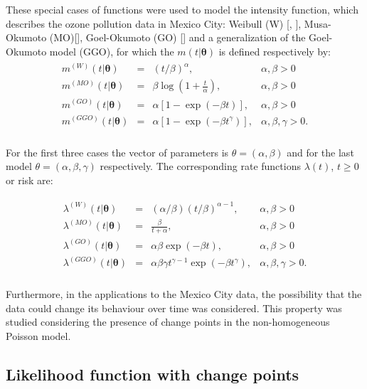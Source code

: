\documentclass[APA,STIX1COL]{WileyNJD-v2}
\begin{document}
These special cases of functions were used to model the  intensity function, which describes the ozone pollution data in Mexico City: Weibull (W) [\cite{Govind95}, \cite{Cid99}], Musa-Okumoto (MO)[\cite{Musa84}], Goel-Okumoto (GO) [\cite{Goel78}] and a generalization of the Goel-Okumoto model (GGO), for which the $m(t|\mathbf{\theta})$ is defined respectively by:
\begin{eqnarray}
	\label{eq1}
	\begin{array}{llll}
		m^{(W)}(t|\mathbf{\theta}) &=& (t/\beta)^{\alpha}, &\alpha ,\beta >0\\
		m^{(MO)}(t|\mathbf{\theta}) &=& \beta\log \left(1+\frac{t}{\alpha}\right), &\alpha ,\beta >0\\
		m^{(GO)}(t|\mathbf{\theta}) &=& \alpha [1-\exp (-\beta t)], &\alpha ,\beta >0\\
		m^{(GGO)}(t|\mathbf{\theta}) &=& \alpha [1-\exp (-\beta t^\gamma)], &\alpha ,\beta , \gamma >0.\\
	\end{array}
\end{eqnarray}

For the first three cases the vector of parameters is $\theta=(\alpha ,\beta )$ and for the last model $\theta=(\alpha ,\beta, \gamma)$ respectively. The corresponding rate functions $\lambda(t)$, $t\geq 0$ or risk are: 

\begin{eqnarray}
	\label{eq2}
	\begin{array}{llll}
		\lambda^{(W)}(t|\mathbf{\theta}) &=& (\alpha/\beta)(t/\beta)^{\alpha-1}, &\alpha ,\beta >0\\
		\lambda^{(MO)}(t|\mathbf{\theta}) &=& \frac{\beta}{t+\alpha}, &\alpha ,\beta >0\\
		\lambda^{(GO)}(t|\mathbf{\theta}) &=& \alpha\beta\exp (-\beta t), &\alpha ,\beta >0\\
		\lambda^{(GGO)}(t|\mathbf{\theta}) &=& \alpha\beta\gamma t^{\gamma-1}\exp (-\beta t^\gamma), &\alpha ,\beta , \gamma >0.\\
	\end{array}
\end{eqnarray}

Furthermore, in the applications to the Mexico City data, the possibility that the data could change its behaviour over time was considered. This property was studied considering the presence of change points in the non-homogeneous Poisson model.\\ 


\subsection{Likelihood function with change points}
\end{document}
